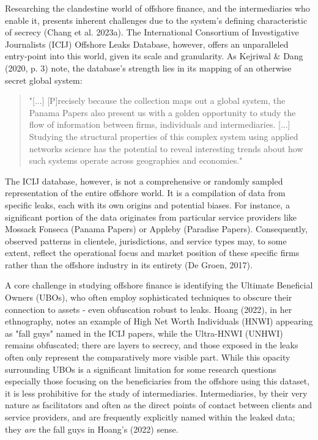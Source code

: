 Researching the clandestine world of offshore finance, and the intermediaries who enable it, presents inherent challenges due to the system's defining characteristic of secrecy (Chang et al. 2023a). The International Consortium of Investigative Journalists (ICIJ) Offshore Leaks Database, however, offers an unparalleled entry-point into this world, given its scale and granularity. As Kejriwal \& Dang (2020, p. 3) note, the database's strength lies in its mapping of an otherwise secret global system:

\begin{quote}
    "[...] [P]recisely because the collection maps out a global system, the Panama Papers also present us with a golden opportunity to study the flow of information between firms, individuals and intermediaries. [...] Studying the structural properties of this complex system using applied networks science has the potential to reveal interesting trends about how such systems operate across geographies and economies."
\end{quote}

The ICIJ database, however, is not a comprehensive or randomly sampled representation of the entire offshore world. It is a compilation of data from specific leaks, each with its own origins and potential biases. For instance, a significant portion of the data originates from particular service providers like Mossack Fonseca (Panama Papers) or Appleby (Paradise Papers). Consequently, observed patterns in clientele, jurisdictions, and service types may, to some extent, reflect the operational focus and market position of these specific firms rather than the offshore industry in its entirety (De Groen, 2017). 

A core challenge in studying offshore finance is identifying the Ultimate Beneficial Owners (UBOs), who often employ sophisticated techniques to obscure their connection to assets - even obfuscation robust to leaks. Hoang (2022), in her ethnography, notes an example of High Net Worth Individuals (HNWI) appearing as "fall guys" named in the ICIJ papers, while the Ultra-HNWI (UNHWI) remains obfuscated; there are layers to secrecy, and those exposed in the leaks often only represent the comparatively more visible part. While this opacity surrounding UBOs is a significant limitation for some research questions especially those focusing on the beneficiaries from the offshore using this dataset, it is less prohibitive for the study of intermediaries. Intermediaries, by their very nature as facilitators and often as the direct points of contact between clients and service providers, and are frequently explicitly named within the leaked data; they \textit{are} the fall guys in Hoang's (2022) sense.

